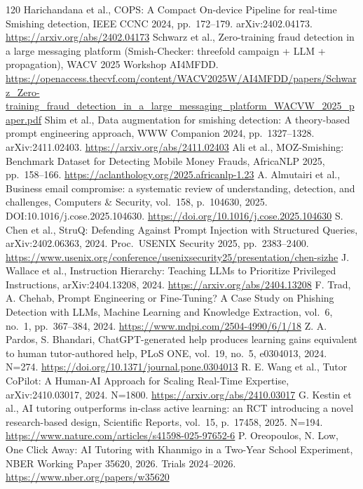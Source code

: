 \documentclass[11pt,a4paper]{article}
\begin{document}
\begin{thebibliography}{120}
 Harichandana et al., COPS: A Compact On-device Pipeline for real-time Smishing detection, IEEE CCNC 2024, pp.~172--179. arXiv:2402.04173. \url{https://arxiv.org/abs/2402.04173}
 Schwarz et al., Zero-training fraud detection in a large messaging platform (Smish-Checker: threefold campaign + LLM + propagation), WACV 2025 Workshop AI4MFDD. \url{https://openaccess.thecvf.com/content/WACV2025W/AI4MFDD/papers/Schwarz_Zero-training_fraud_detection_in_a_large_messaging_platform_WACVW_2025_paper.pdf}
 Shim et al., Data augmentation for smishing detection: A theory-based prompt engineering approach, WWW Companion 2024, pp.~1327--1328. arXiv:2411.02403. \url{https://arxiv.org/abs/2411.02403}
 Ali et al., MOZ-Smishing: Benchmark Dataset for Detecting Mobile Money Frauds, AfricaNLP 2025, pp.~158--166. \url{https://aclanthology.org/2025.africanlp-1.23}
 A. Almutairi et al., Business email compromise: a systematic review of understanding, detection, and challenges, Computers \& Security, vol.~158, p.~104630, 2025. DOI:10.1016/j.cose.2025.104630. \url{https://doi.org/10.1016/j.cose.2025.104630}
 S. Chen et al., StruQ: Defending Against Prompt Injection with Structured Queries, arXiv:2402.06363, 2024. Proc.\ USENIX Security 2025, pp.~2383--2400. \url{https://www.usenix.org/conference/usenixsecurity25/presentation/chen-sizhe}
 J. Wallace et al., Instruction Hierarchy: Teaching LLMs to Prioritize Privileged Instructions, arXiv:2404.13208, 2024. \url{https://arxiv.org/abs/2404.13208}
 F. Trad, A. Chehab, Prompt Engineering or Fine-Tuning? A Case Study on Phishing Detection with LLMs, Machine Learning and Knowledge Extraction, vol.~6, no.~1, pp.~367--384, 2024. \url{https://www.mdpi.com/2504-4990/6/1/18}
 Z. A. Pardos, S. Bhandari, ChatGPT-generated help produces learning gains equivalent to human tutor-authored help, PLoS ONE, vol.~19, no.~5, e0304013, 2024. N=274. \url{https://doi.org/10.1371/journal.pone.0304013}
 R. E. Wang et al., Tutor CoPilot: A Human-AI Approach for Scaling Real-Time Expertise, arXiv:2410.03017, 2024. N=1800. \url{https://arxiv.org/abs/2410.03017}
 G. Kestin et al., AI tutoring outperforms in-class active learning: an RCT introducing a novel research-based design, Scientific Reports, vol.~15, p.~17458, 2025. N=194. \url{https://www.nature.com/articles/s41598-025-97652-6}
 P. Oreopoulos, N. Low, One Click Away: AI Tutoring with Khanmigo in a Two-Year School Experiment, NBER Working Paper 35620, 2026. Trials 2024--2026. \url{https://www.nber.org/papers/w35620}

\end{thebibliography}
\end{document}
